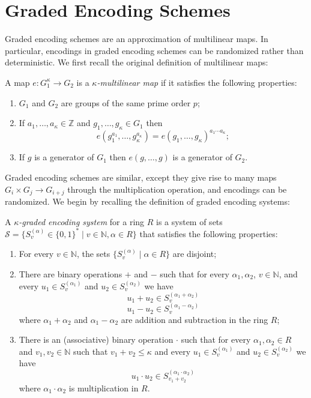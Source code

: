 \renewcommand\thesection{\Alph{section}}
\setcounter{section}{0}
\setcounter{definition}{0}
\section{Graded Encoding Schemes}

Graded encoding schemes are an approximation of multilinear maps.  In particular, encodings in graded encoding schemes can be randomized rather than deterministic.  We first recall the original definition of multilinear maps:

\begin{definition}
A map $e: G_1^\kappa \to G_2$ is a \emph{$\kappa$-multilinear map} if it satisfies the following properties:
\begin{enumerate}
\item $G_1$ and $G_2$ are groups of the same prime order $p$;
\item If $a_1, \ldots, a_\kappa \in \mathbb{Z}$ and $g_1, \ldots, g_\kappa \in G_1$ then $$e(g_1^{a_1}, \ldots, g_\kappa^{a_\kappa}) = e(g_1, \ldots, g_\kappa)^{a_1 \cdots a_\kappa};$$
\item If $g$ is a generator of $G_1$ then $e(g, \ldots, g)$ is a generator of $G_2$. 
\end{enumerate}
\end{definition}

Graded encoding schemes are similar, except they give rise to many maps $G_i \times G_j \to G_{i+j}$ through the multiplication operation, and encodings can be randomized.  We begin by recalling the definition of graded encoding systems:

\begin{definition}
A \emph{$\kappa$-graded encoding system} for a ring $R$ is a system of sets $\mathcal{S} = \{S_v^{(\alpha)} \in \{0,1\}^* \mid v \in \mathbb{N}, \alpha \in R\}$ that satisfies the following properties:

\begin{enumerate}
\item For every $v \in \mathbb{N}$, the sets $\{S_v^{(\alpha)} \mid \alpha \in R\}$ are disjoint;
\item There are binary operations $+$ and $-$ such that for every $\alpha_1, \alpha_2$, $v \in \mathbb{N}$, and every $u_1 \in S_v^{(\alpha_1)}$ and $u_2 \in S_v^{(\alpha_2)}$ we have $$u_1 + u_2 \in S_v^{(\alpha_1 + \alpha_2)}$$ $$u_1 - u_2 \in S_v^{(\alpha_1 - \alpha_2)}$$ where $\alpha_1 + \alpha_2$ and $\alpha_1 - \alpha_2$ are addition and subtraction in the ring $R$;
\item There is an (associative) binary operation $\cdot$ such that for every $\alpha_1, \alpha_2 \in R$ and $v_1, v_2 \in \mathbb{N}$ such that $v_1 + v_2 \leq \kappa$ and every $u_1 \in S_v^{(\alpha_1)}$ and $u_2 \in S_v^{(\alpha_2)}$ we have $$u_1 \cdot u_2 \in S_{v_1 + v_2}^{(\alpha_1 \cdot \alpha_2)}$$ where $\alpha_1\cdot\alpha_2$ is multiplication in $R$.
\end{enumerate}
\end{definition}

